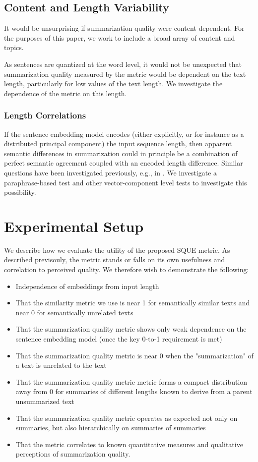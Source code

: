\documentclass{article}
\begin{document}
\subsection{Content and Length Variability}

It would be unsurprising if summarization quality were content-dependent.  
For the purposes of this paper, we work to include a broad array of content and topics.

As sentences are quantized at the word level, it would not be unexpected that summarization quality measured by the metric would be dependent on the text length, particularly for low values of the text length.  We investigate the dependence of the metric on this length.

\subsubsection{Length Correlations}

If the sentence embedding model encodes (either explicitly, or for instance as a distributed principal component) the input sequence length, then apparent semantic differences in summarization could in principle be a combination of perfect semantic agreement coupled with an encoded length difference.  
Similar questions have been investigated previously, e.g., in \citet{finegrained}.
We investigate a paraphrase-based test and other vector-component level tests to investigate this possibility.


\section{Experimental Setup}

We describe how we evaluate the utility of the proposed SQUE metric.  
As described previsouly, the metric stands or falls on its own usefulness and correlation to perceived quality.
We therefore wish to demonstrate the following:

\begin{itemize}
	\item Independence of embeddings from input length
	\item That the similarity metric we use is near 1 for semantically similar texts and near 0 for semantically unrelated texts
    \item That the summarization quality metric shows only weak dependence on the sentence embedding model (once the key 0-to-1 requirement is met)
	\item That the summarization quality metric is near 0 when the "summarization" of a text is unrelated to the text
	\item That the summarization quality metric metric forms a compact distribution away from 0 for summaries of different lengths known to derive from a parent unsummarized text
	\item That the summarization quality metric operates as expected not only on summaries, but also hierarchically on summaries of summaries
	\item That the metric correlates to known quantitative measures and qualitative perceptions of summarization quality.
\end{itemize}
\end{document}
